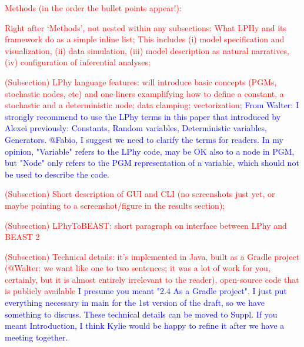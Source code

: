 \documentclass[10pt,letterpaper,table]{article}
\begin{document}
\textcolor{red}{Methods (in the order the bullet points appear!):}
\begin{enumerate}
    \item \textcolor{red}{Right after `Methods', not nested within any subsections: What LPHy and its framework do as a simple inline list; This includes (i) model specification and visualization, (ii) data simulation, (iii) model description as natural narratives, (iv) configuration of inferential analyses;}
    \item \textcolor{red}{(Subsection) LPhy language features: will introduce basic concepts (PGMs, stochastic nodes, etc) and one-liners examplifying how to define a constant, a stochastic and a deterministic node; data clamping; vectorization;} \textcolor{blue}{From Walter: I strongly recommend to use the LPhy terms in this paper that introduced by Alexei previously: Constants, Random variables, Deterministic variables, Generators. @Fabio, I suggest we need to clarify the terms for readers. In my opinion, "Variable" refers to the LPhy code, may be OK also to a node in PGM, but "Node" only refers to the PGM representation of a variable, which should not be used to describe the code.}
    \item \textcolor{red}{(Subsection) Short description of GUI and CLI (no screenshots just yet, or maybe pointing to a screenshot/figure in the results section);}
    \item \textcolor{red}{(Subsection) LPhyToBEAST: short paragraph on interface between LPhy and BEAST 2
    \item \textcolor{red}{(Subsection) Technical details: it's implemented in Java, built as a Gradle project (@Walter: we want like one to two sentences; it was a lot of work for you, certainly, but it is almost entirely irrelevant to the reader), open-source code that is publicly available} \textcolor{blue}{I presume you meant "2.4 As a Gradle project". I just put everything necessary in main for the 1st version of the draft, so we have something to discuss. These technical details can be moved to Suppl. If you meant Introduction, I think Kylie would be happy to refine it after we have a meeting together.}}
    \newline
\end{enumerate}
\end{document}
